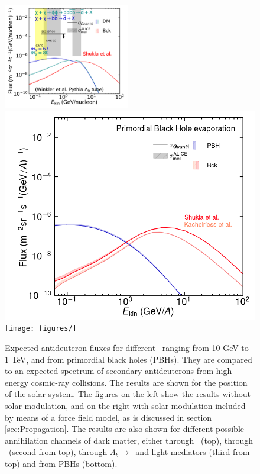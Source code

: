 \begin{figure}[hbtp]
    \includegraphics[width=0.49\textwidth]{figures/antideuteron_lambdaB_TOA.pdf}
    \includegraphics[width=.49\textwidth]{figures/antideuteron_fluxes_PBH_LIS.png}
    \texttt{[image: figures/]}
    \caption{Expected antideuteron fluxes for different \dmm\ ranging from 10 GeV to 1 TeV, and from primordial black holes (PBHs). They are compared to an expected spectrum of secondary antideuterons from high-energy cosmic-ray collisions. The results are shown for the position of the solar system. The figures on the left show the results without solar modulation, and on the right with solar modulation included by means of a force field model, as is discussed in section \ref{sec:Propagation}. The results are also shown for different possible annihilation channels of dark matter, either through \WW\ (top), through \bb\ (second from top), through $\Lambda_b \rightarrow $\bb\ and light mediators (third from top) and from PBHs (bottom).}
    \label{fig:Results_dbar_fluxes_diff_DM_masses}
\end{figure}

